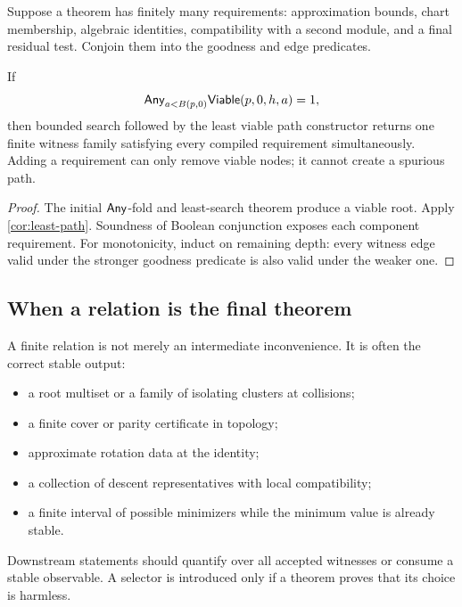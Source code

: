 Suppose a theorem has finitely many requirements: approximation bounds, chart
membership, algebraic identities, compatibility with a second module, and a
final residual test.  Conjoin them into the goodness and edge predicates.

\begin{theorem}
\label{thm:amalgamation}
If
\[
 \mathsf{Any}_{a<B(p,0)}\mathsf{Viable}(p,0,h,a)=1,
\]
then bounded search followed by the least viable path constructor returns one
finite witness family satisfying every compiled requirement simultaneously.
Adding a requirement can only remove viable nodes; it cannot create a spurious
path.
\end{theorem}

\begin{proof}
The initial \(\mathsf{Any}\)-fold and least-search theorem produce a viable root.
Apply \cref{cor:least-path}.  Soundness of Boolean conjunction exposes each
component requirement.  For monotonicity, induct on remaining depth: every
witness edge valid under the stronger goodness predicate is also valid under
the weaker one.
\end{proof}

\subsection{When a relation is the final theorem}

A finite relation is not merely an intermediate inconvenience.  It is often
the correct stable output:
\begin{itemize}
\item a root multiset or a family of isolating clusters at collisions;
\item a finite cover or parity certificate in topology;
\item approximate rotation data at the identity;
\item a collection of descent representatives with local compatibility;
\item a finite interval of possible minimizers while the minimum value is
      already stable.
\end{itemize}
Downstream statements should quantify over all accepted witnesses or consume a
stable observable.  A selector is introduced only if a theorem proves that its
choice is harmless.
